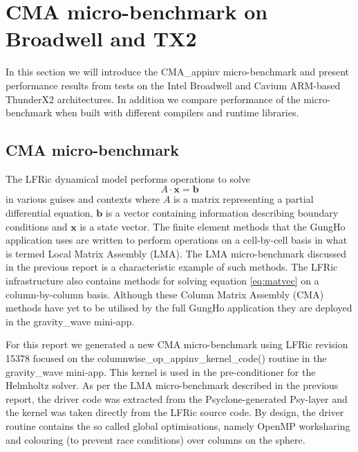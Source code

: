 \section{CMA micro-benchmark on Broadwell and TX2}
In this section we will introduce the CMA\_appinv micro-benchmark and present performance results from tests on the Intel Broadwell and Cavium ARM-based ThunderX2 architectures.
In addition we compare performance of the micro-benchmark when built with different compilers and runtime libraries.

\subsection{CMA micro-benchmark}

The LFRic dynamical model performs operations to solve
\begin{equation} \label{eq:matvec}
A \cdot \mathbf{x} = \mathbf{b}
\end{equation}
in various guises and contexts where $A$ is a matrix representing a partial differential equation, $\mathbf{b}$ is a vector containing information describing boundary conditions and $\mathbf{x}$ is a state vector.
The finite element methods that the GungHo application uses are written to perform operations on a cell-by-cell basis in what is termed Local Matrix Assembly (LMA).
The LMA micro-benchmark discussed in the previous report is a characteristic example of such methods.
The LFRic infrastructure also contains methods for solving equation \ref{eq:matvec} on a column-by-column basis.
Although these Column Matrix Assembly (CMA) methods have yet to be utilised by the full GungHo application they are deployed in the gravity\_wave mini-app.

For this report we generated a new CMA micro-benchmark using LFRic revision 15378 focused on the columnwise\_op\_appinv\_kernel\_code() routine in the gravity\_wave mini-app.
This kernel is used in the pre-conditioner for the Helmholtz solver.
As per the LMA micro-benchmark described in the previous report, the driver code was extracted from the Psyclone-generated Psy-layer and the kernel was taken directly from the LFRic source code.
By design, the driver routine contains the so called global optimisations, namely OpenMP worksharing and colouring (to prevent race conditions) over columns on the sphere.

